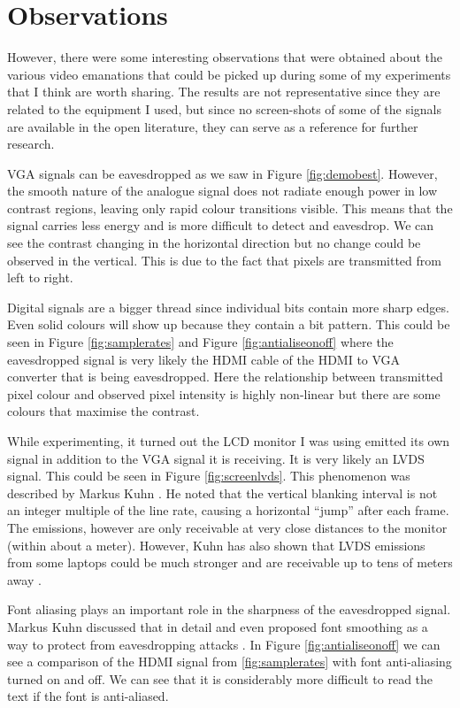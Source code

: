 \documentclass[a4paper,12pt,twoside,openright]{report}
\begin{document}
\section{Observations}

However, there were some interesting observations that were obtained about the various video emanations that could be picked up during some of my experiments that I think are worth sharing. The results are not representative since they are related to the equipment I used, but since no screen-shots of some of the signals are available in the open literature, they can serve as a reference for further research.

VGA signals can be eavesdropped as we saw in Figure \ref{fig:demobest}. However, the smooth nature of the analogue signal does not radiate enough power in low contrast regions, leaving only rapid colour transitions visible. This means that the signal carries less energy and is more difficult to detect and eavesdrop. We can see the contrast changing in the horizontal direction but no change could be observed in the vertical. This is due to the fact that pixels are transmitted from left to right.

Digital signals are a bigger thread since individual bits contain more sharp edges. Even solid colours will show up because they contain a bit pattern. This could be seen in Figure \ref{fig:samplerates} and Figure \ref{fig:antialiseonoff}  where the eavesdropped signal is very likely the HDMI cable of the HDMI to VGA converter that is being eavesdropped. Here the relationship between transmitted pixel colour and observed pixel intensity is highly non-linear but there are some colours that maximise the contrast.

While experimenting, it turned out the LCD monitor I was using emitted its own signal in addition to the VGA signal it is receiving. It is very likely an LVDS signal. This could be seen in Figure \ref{fig:screenlvds}. This phenomenon was described by Markus Kuhn \cite{kuhn2011compromising}. He noted that the vertical blanking interval is not an integer multiple of the line rate, causing a horizontal ``jump'' after each frame. The emissions, however are only receivable at very close distances to the monitor (within about a meter). However, Kuhn has also shown that LVDS emissions from some laptops could be much stronger and are receivable up to tens of meters away \cite{kuhn2003compromising}. 

Font aliasing plays an important role in the sharpness of the eavesdropped signal. Markus Kuhn discussed that in detail and even proposed font smoothing as a way to protect from eavesdropping attacks \cite{kuhn2003compromising}. In Figure \ref{fig:antialiseonoff} we can see a comparison of the HDMI signal from \ref{fig:samplerates} with font anti-aliasing turned on and off. We can see that it is considerably more difficult to read the text if the font is anti-aliased.
\end{document}
